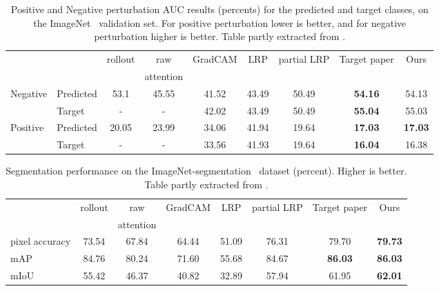 \documentclass{article}
\begin{document}
\setlength\tabcolsep{2pt}
\begin{table*}[!h]
    \centering
    \begin{tabular*}{\linewidth}{@{\extracolsep{\fill}}llccccccc}
        \toprule
        &&rollout & raw  & GradCAM & LRP & partial LRP & Target paper & Ours\\
        & &~\cite{samira2005} & attention &~\cite{selvaraju2017grad} &~\cite{binder2016layer} &~\cite{voita2019analyzing} &~\cite{mainpaper} & \\
        \midrule
        \multirow{2}{*}{Negative} &Predicted & 53.1 & 45.55 & 41.52 & 43.49 & 50.49 & \textbf{54.16} & 54.13\\
        &Target & - & - & 42.02 & 43.49 & 50.49 & \textbf{55.04} & 55.03 \\
        \midrule
        \multirow{2}{*}{Positive} &Predicted & 20.05 & 23.99 & 34.06 & 41.94 & 19.64 & \textbf{17.03} & \textbf{17.03}\\
        &Target & - & - & 33.56 & 41.93 & 19.64 & \textbf{16.04} & 16.38\\
        \bottomrule
    \end{tabular*}
    \caption{Positive and Negative perturbation AUC results (percents) for the predicted and target classes, on the ImageNet~\cite{russakovsky2015ImageNet} validation set. For positive perturbation lower is better, and for negative perturbation higher is better. Table partly extracted from \cite{mainpaper}.}
    \label{tab:perturbations}
\end{table*}
    \medskip

\begin{table*}[!h]
    \begin{tabular*}{\linewidth}{@{\extracolsep{\fill}}lccccccc}
        \toprule
        &rollout & raw  & GradCAM & LRP & partial LRP & Target paper & Ours\\
        &~\cite{samira2005} & attention &~\cite{selvaraju2017grad} &~\cite{binder2016layer} &~\cite{voita2019analyzing} &~\cite{mainpaper} & \\
        \midrule
        pixel accuracy & 73.54 & 67.84 & 64.44 & 51.09 & 76.31 & 79.70 & \textbf{79.73}\\
        mAP & 84.76 & 80.24 & 71.60 & 55.68 & 84.67 & \textbf{86.03} & \textbf{86.03}\\
        mIoU & 55.42 & 46.37 & 40.82 & 32.89 & 57.94 & 61.95 & \textbf{62.01}\\
        \bottomrule
    \end{tabular*}
    \caption{Segmentation performance on the ImageNet-segmentation~\cite{imagenet-seg} dataset (percent). Higher is better. Table partly extracted from \cite{mainpaper}.}
    \label{tab:segmentation}
\end{table*}
\end{document}
